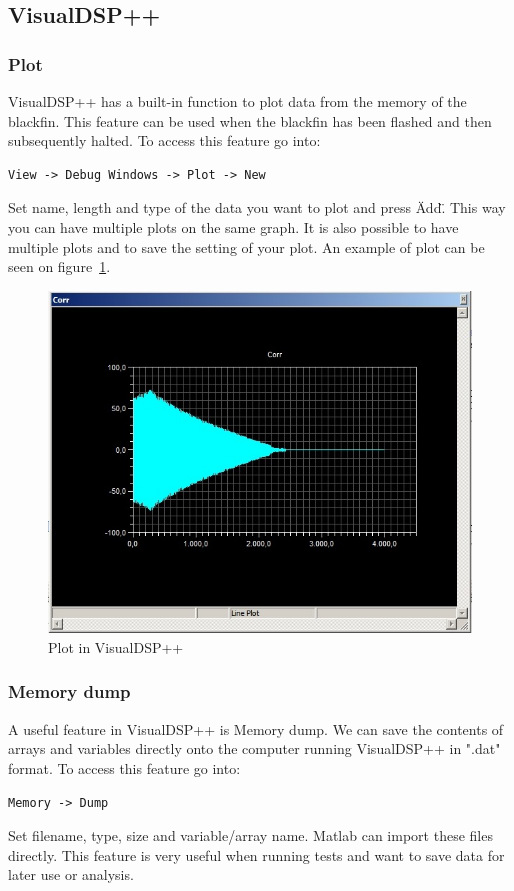 \subsection{VisualDSP++}
\subsubsection{Plot}
VisualDSP++ has a built-in function to plot data from the memory of the blackfin. This feature can be used when the blackfin has been flashed and then subsequently halted. To access this feature go into:
\begin{verbatim}
View -> Debug Windows -> Plot -> New
\end{verbatim}
Set name, length and type of the data you want to plot and press \"Add\". This way you can have multiple plots on the same graph. It is also possible to have multiple plots and to save the setting of your plot. An example of plot can be seen on figure~\ref{fig:visualdspplot}.
\begin{figure}[H]
\centering
\includegraphics[scale=0.5]{billeder/visualdspplot}
\caption{Plot in VisualDSP++}
\label{fig:visualdspplot}
\end{figure}
\subsubsection{Memory dump}
A useful feature in VisualDSP++ is Memory dump. We can save the contents of arrays and variables directly onto the computer running VisualDSP++ in ".dat" format. To access this feature go into:
\begin{verbatim}
Memory -> Dump
\end{verbatim}
Set filename, type, size and variable/array name. Matlab can import these files directly. This feature is very useful when running tests and want to save data for later use or analysis.\\
